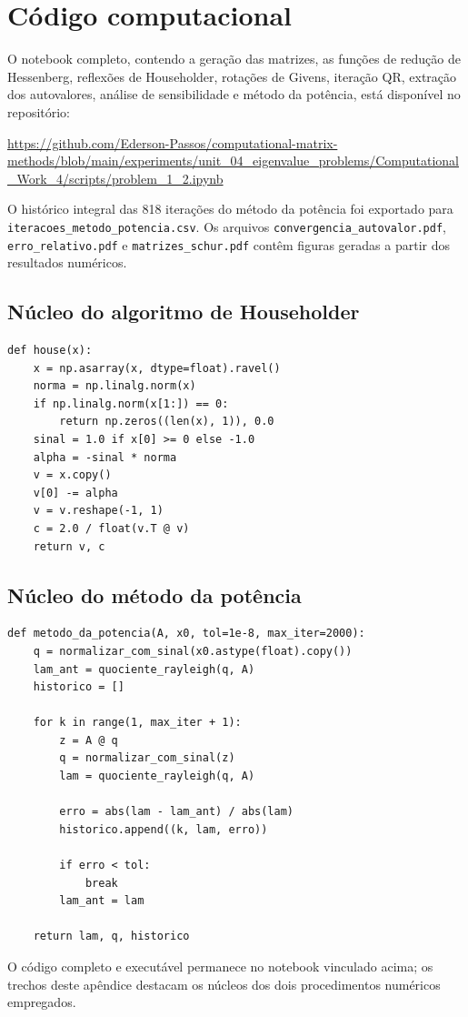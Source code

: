 \section{Código computacional}
\label{ap:codigo}

O notebook completo, contendo a geração das matrizes, as funções de redução de Hessenberg, reflexões de Householder, rotações de Givens, iteração QR, extração dos autovalores, análise de sensibilidade e método da potência, está disponível no repositório:

\begin{center}
  \url{https://github.com/Ederson-Passos/computational-matrix-methods/blob/main/experiments/unit_04_eigenvalue_problems/Computational_Work_4/scripts/problem_1_2.ipynb}
\end{center}

O histórico integral das 818 iterações do método da potência foi exportado para \nolinkurl{iteracoes_metodo_potencia.csv}. Os arquivos \nolinkurl{convergencia_autovalor.pdf}, \nolinkurl{erro_relativo.pdf} e \nolinkurl{matrizes_schur.pdf} contêm figuras geradas a partir dos resultados numéricos.

\subsection{Núcleo do algoritmo de Householder}

\begin{lstlisting}
def house(x):
    x = np.asarray(x, dtype=float).ravel()
    norma = np.linalg.norm(x)
    if np.linalg.norm(x[1:]) == 0:
        return np.zeros((len(x), 1)), 0.0
    sinal = 1.0 if x[0] >= 0 else -1.0
    alpha = -sinal * norma
    v = x.copy()
    v[0] -= alpha
    v = v.reshape(-1, 1)
    c = 2.0 / float(v.T @ v)
    return v, c
\end{lstlisting}

\subsection{Núcleo do método da potência}

\begin{lstlisting}
def metodo_da_potencia(A, x0, tol=1e-8, max_iter=2000):
    q = normalizar_com_sinal(x0.astype(float).copy())
    lam_ant = quociente_rayleigh(q, A)
    historico = []

    for k in range(1, max_iter + 1):
        z = A @ q
        q = normalizar_com_sinal(z)
        lam = quociente_rayleigh(q, A)

        erro = abs(lam - lam_ant) / abs(lam)
        historico.append((k, lam, erro))

        if erro < tol:
            break
        lam_ant = lam

    return lam, q, historico
\end{lstlisting}

O código completo e executável permanece no notebook vinculado acima; os trechos deste apêndice destacam os núcleos dos dois procedimentos numéricos empregados.
